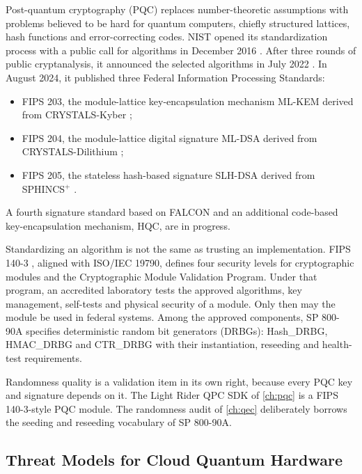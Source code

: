 Post-quantum cryptography (PQC) \cite{bernstein2017pqc} replaces number-theoretic assumptions with problems believed to be hard for quantum computers, chiefly structured lattices, hash functions and error-correcting codes. NIST opened its standardization process with a public call for algorithms in December 2016 \cite{nist2016pqccall}. After three rounds of public cryptanalysis, it announced the selected algorithms in July 2022 \cite{nist2022ir8413}. In August 2024, it published three Federal Information Processing Standards:
\begin{itemize}
\item FIPS 203, the module-lattice key-encapsulation mechanism ML-KEM derived from CRYSTALS-Kyber \cite{nist2024fips203};
\item FIPS 204, the module-lattice digital signature ML-DSA derived from CRYSTALS-Dilithium \cite{nist2024fips204};
\item FIPS 205, the stateless hash-based signature SLH-DSA derived from SPHINCS$^{+}$ \cite{nist2024fips205}.
\end{itemize}
A fourth signature standard based on FALCON and an additional code-based key-encapsulation mechanism, HQC, are in progress.

Standardizing an algorithm is not the same as trusting an implementation. FIPS 140-3 \cite{nist2019fips1403}, aligned with ISO/IEC 19790, defines four security levels for cryptographic modules and the Cryptographic Module Validation Program. Under that program, an accredited laboratory tests the approved algorithms, key management, self-tests and physical security of a module. Only then may the module be used in federal systems. Among the approved components, SP 800-90A \cite{nist2015sp80090a} specifies deterministic random bit generators (DRBGs): Hash\_DRBG, HMAC\_DRBG and CTR\_DRBG with their instantiation, reseeding and health-test requirements.

Randomness quality is a validation item in its own right, because every PQC key and signature depends on it. The Light Rider QPC SDK of \cref{ch:pqc} \cite{guo2026lightriderqpc} is a FIPS 140-3-style PQC module. The randomness audit of \cref{ch:qec} \cite{guo2026qecaudit} deliberately borrows the seeding and reseeding vocabulary of SP 800-90A.

\subsection{Threat Models for Cloud Quantum Hardware}

